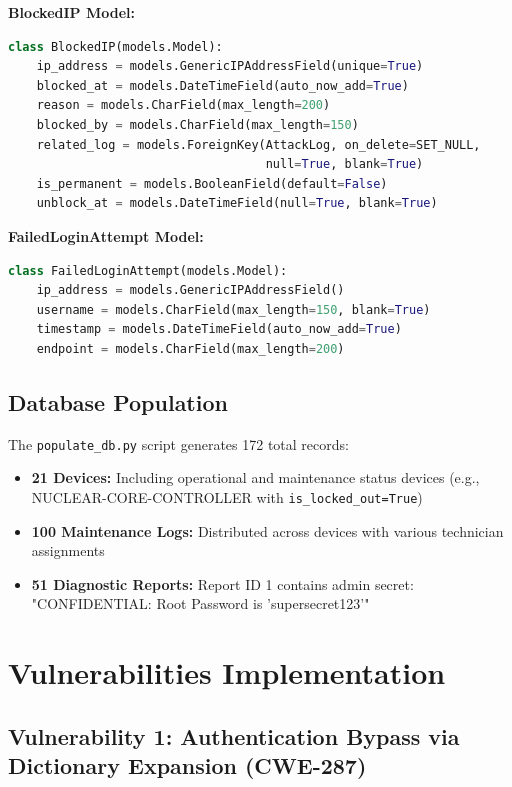 \documentclass[12pt,a4paper]{article}
\begin{document}
\textbf{BlockedIP Model:}
\begin{lstlisting}[language=Python]
class BlockedIP(models.Model):
    ip_address = models.GenericIPAddressField(unique=True)
    blocked_at = models.DateTimeField(auto_now_add=True)
    reason = models.CharField(max_length=200)
    blocked_by = models.CharField(max_length=150)
    related_log = models.ForeignKey(AttackLog, on_delete=SET_NULL, 
                                    null=True, blank=True)
    is_permanent = models.BooleanField(default=False)
    unblock_at = models.DateTimeField(null=True, blank=True)
\end{lstlisting}

\textbf{FailedLoginAttempt Model:}
\begin{lstlisting}[language=Python]
class FailedLoginAttempt(models.Model):
    ip_address = models.GenericIPAddressField()
    username = models.CharField(max_length=150, blank=True)
    timestamp = models.DateTimeField(auto_now_add=True)
    endpoint = models.CharField(max_length=200)
\end{lstlisting}

\subsection{Database Population}

The \texttt{populate\_db.py} script generates 172 total records:
\begin{itemize}[leftmargin=*]
    \item \textbf{21 Devices:} Including operational and maintenance status devices (e.g., NUCLEAR-CORE-CONTROLLER with \texttt{is\_locked\_out=True})
    \item \textbf{100 Maintenance Logs:} Distributed across devices with various technician assignments
    \item \textbf{51 Diagnostic Reports:} Report ID 1 contains admin secret: "CONFIDENTIAL: Root Password is 'supersecret123'"
\end{itemize}

\newpage

\section{Vulnerabilities Implementation}

\subsection{Vulnerability 1: Authentication Bypass via Dictionary Expansion (CWE-287)}
\end{document}
